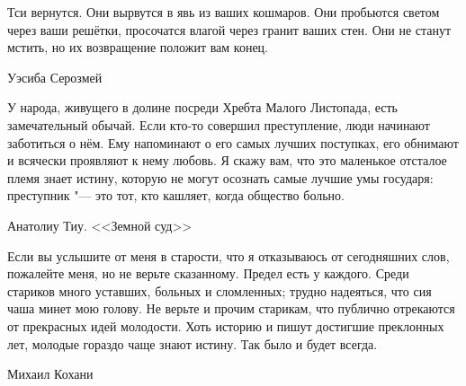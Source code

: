 \epigraph
{Тси вернутся.
Они вырвутся в явь из ваших кошмаров.
Они пробьются светом через ваши решётки, просочатся влагой через гранит ваших стен.
Они не станут мстить, но их возвращение положит вам конец.}
{Уэсиба Серозмей}

\epigraph
{У народа, живущего в долине посреди Хребта Малого Листопада, есть замечательный обычай.
Если кто-то совершил преступление, люди начинают заботиться о нём.
Ему напоминают о его самых лучших поступках, его обнимают и всячески проявляют к нему любовь.
Я скажу вам, что это маленькое отсталое племя знает истину, которую не могут осознать самые лучшие умы государя: преступник "--- это тот, кто кашляет, когда общество больно.}
{Анатолиу Тиу.
<<Земной суд>>}

\epigraph
{Если вы услышите от меня в старости, что я отказываюсь от сегодняшних слов, пожалейте меня, но не верьте сказанному.
Предел есть у каждого.
Среди стариков много уставших, больных и сломленных;
трудно надеяться, что сия чаша минет мою голову.
Не верьте и прочим старикам, что публично отрекаются от прекрасных идей молодости.
Хоть историю и пишут достигшие преклонных лет, молодые гораздо чаще знают истину.
Так было и будет всегда.}
{Михаил Кохани}

